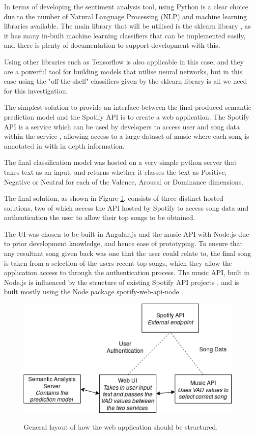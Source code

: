 In terms of developing the sentiment analysis tool, using Python is a clear choice due to the number of Natural Language Processing (NLP) and machine learning libraries available. The main library that will be utilised is the sklearn library \cite{sklearn}, as it has many in-built machine learning classifiers that can be implemented easily, and there is plenty of documentation to support development with this. 

Using other libraries such as Tensorflow is also applicable in this case,  and they are a powerful tool for building models that utilise neural networks, but in this case using the "off-the-shelf" classifiers given by the sklearn library is all we need for this investigation.

The simplest solution to provide an interface between the final produced semantic prediction model and the Spotify API is to create a web application. The Spotify API is a service which can be used by developers to access user and song data within the service \cite{nodeSpotify}, allowing access to a large dataset of music where each song is annotated in with in depth information.

The final classification model was hosted on a very simple python server that takes text as an input, and returns whether it classes the text as Positive, Negative or Neutral for each of the Valence, Arousal or Dominance dimensions. 

The final solution, as shown in Figure \ref{implementationLayout}, consists of three distinct hosted solutions, two of which access the API hosted by Spotify to access song data and authentication the user to allow their top songs to be obtained.

The UI was chosen to be built in Angular.js and the music API with Node.js due to prior development knowledge, and hence ease of prototyping. 
To ensure that any resultant song given back was one that the user could relate to, the final song is taken from a selection of the users recent top songs, which they allow the application access to through the authentication process.
The music API, built in Node.js is influenced by the structure of existing Spotify API projects \cite{moodtape}, and is built mostly using the Node package spotify-web-api-node \cite{nodeSpotify}.

\begin{figure}[ht]
\caption{General layout of how the web application should be structured.}
\centering
\includegraphics[scale=0.6]{litImgs/interfaceLayout.png}
\label{implementationLayout}
\end{figure}

